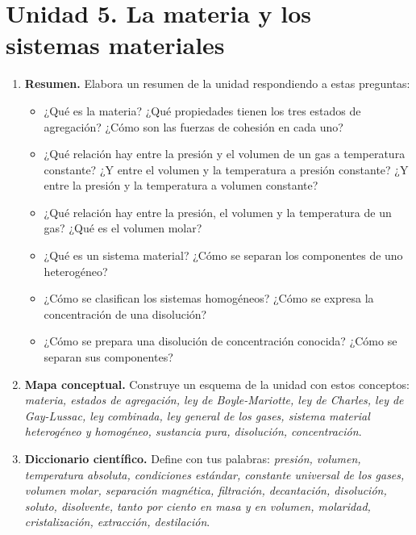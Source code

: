 \section{Unidad 5. La materia y los sistemas materiales}

\begin{enumerate}[label=\numberballred]
    \item \textbf{Resumen.} Elabora un resumen de la unidad respondiendo a estas preguntas:
    \begin{itemize}
        \item ¿Qué es la materia? ¿Qué propiedades tienen los tres estados de agregación? ¿Cómo son las fuerzas de cohesión en cada uno?
        \item ¿Qué relación hay entre la presión y el volumen de un gas a temperatura constante? ¿Y entre el volumen y la temperatura a presión constante? ¿Y entre la presión y la temperatura a volumen constante?
        \item ¿Qué relación hay entre la presión, el volumen y la temperatura de un gas? ¿Qué es el volumen molar?
        \item ¿Qué es un sistema material? ¿Cómo se separan los componentes de uno heterogéneo?
        \item ¿Cómo se clasifican los sistemas homogéneos? ¿Cómo se expresa la concentración de una disolución?
        \item ¿Cómo se prepara una disolución de concentración conocida? ¿Cómo se separan sus componentes?
    \end{itemize}
    \item \textbf{Mapa conceptual.} Construye un esquema de la unidad con estos conceptos: \emph{materia, estados de agregación, ley de Boyle-Mariotte, ley de Charles, ley de Gay-Lussac, ley combinada, ley general de los gases, sistema material heterogéneo y homogéneo, sustancia pura, disolución, concentración}.
    \item \textbf{Diccionario científico.} Define con tus palabras: \emph{presión, volumen, temperatura absoluta, condiciones estándar, constante universal de los gases, volumen molar, separación magnética, filtración, decantación, disolución, soluto, disolvente, tanto por ciento en masa y en volumen, molaridad, cristalización, extracción, destilación}.
\end{enumerate}


